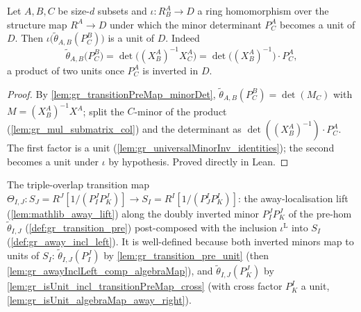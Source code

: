 \begin{lemma}\leanok
  \label{lem:gr_isUnit_incl_transitionPreMap_cross}
  Let \(A, B, C\) be size-\(d\) subsets and \(\iota : R^A_B \to D\) a ring
  homomorphism over the structure map \(R^A \to D\) under which the minor
  determinant \(P^A_C\) becomes a unit of \(D\). Then
  \(\iota\bigl(\tilde\theta_{A,B}(P^B_C)\bigr)\) is a unit of \(D\). Indeed
  \[
    \tilde\theta_{A,B}\bigl(P^B_C\bigr)
      = \det\bigl((X^A_B)^{-1} X^A_C\bigr)
      = \det\bigl((X^A_B)^{-1}\bigr)\cdot P^A_C ,
  \]
  a product of two units once \(P^A_C\) is inverted in \(D\).
\end{lemma}
\begin{proof}

\leanok
  By \cref{lem:gr_transitionPreMap_minorDet},
  \(\tilde\theta_{A,B}(P^B_C) = \det(M_C)\) with \(M = (X^A_B)^{-1} X^A\); split
  the \(C\)-minor of the product (\cref{lem:gr_mul_submatrix_col}) and the
  determinant as \(\det((X^A_B)^{-1}) \cdot P^A_C\). The first factor is a unit
  (\cref{lem:gr_universalMinorInv_identities}); the second becomes a unit under
  \(\iota\) by hypothesis. Proved directly in Lean.
\end{proof}

\begin{definition}\leanok
  \label{def:gr_cocycle_theta_ij}
  The triple-overlap transition map
  \(\Theta_{I,J} : S_J = R^J[1/(P^J_I P^J_K)] \to S_I = R^I[1/(P^I_J P^I_K)]\):
  the away-localisation lift (\cref{lem:mathlib_away_lift}) along the doubly
  inverted minor \(P^J_I P^J_K\) of the pre-hom \(\tilde\theta_{I,J}\)
  (\cref{def:gr_transition_pre}) post-composed with the inclusion
  \(\iota^{\mathrm{L}}\) into \(S_I\) (\cref{def:gr_away_incl_left}). It is
  well-defined because both inverted minors map to units of \(S_I\):
  \(\tilde\theta_{I,J}(P^J_I)\) by \cref{lem:gr_transition_pre_unit} (then
  \cref{lem:gr_awayInclLeft_comp_algebraMap}), and \(\tilde\theta_{I,J}(P^J_K)\)
  by \cref{lem:gr_isUnit_incl_transitionPreMap_cross} (with cross factor
  \(P^I_K\) a unit, \cref{lem:gr_isUnit_algebraMap_away_right}).
\end{definition}

